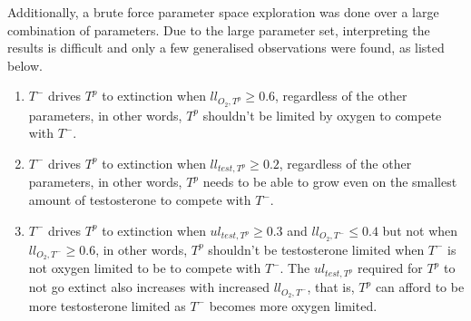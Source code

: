 Additionally, a brute force parameter space exploration was done over a large combination of parameters. Due to the large parameter set, interpreting the results is difficult and only a few generalised observations were found, as listed below.
\begin{enumerate}
  \item $T^-$ drives $T^p$ to extinction when $ll_{O_2,T^p} \geq 0.6$, regardless of the other parameters, in other words, $T^p$ shouldn't be limited by oxygen to compete with $T^-$.
  \item $T^-$ drives $T^p$ to extinction when $ll_{test,T^p} \geq 0.2$, regardless of the other parameters, in other words, $T^p$ needs to be able to grow even on the smallest amount of testosterone to compete with $T^-$.
  \item $T^-$ drives $T^p$ to extinction when $ul_{test,T^p} \geq 0.3$ and $ll_{O_2,T^-} \leq 0.4$ but not when $ll_{O_2,T^-} \geq 0.6$, in other words, $T^p$ shouldn't be testosterone limited when $T^-$ is not oxygen limited to be to compete with $T^-$. The $ul_{test,T^p}$ required for $T^p$ to not go extinct also increases with increased $ll_{O_2,T^-}$, that is, $T^p$ can afford to be more testosterone limited as $T^-$ becomes more oxygen limited.
\end{enumerate}

